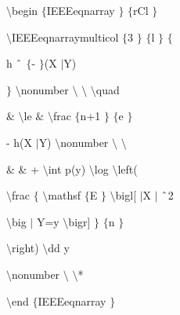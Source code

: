 \vspace{12pt}
\vspace{12pt}
\noindent 
 $  \setminus  $begin $  \{  $IEEEeqnarray $  \}  $ $  \{  $rCl $  \}  $ \par
\vspace{12pt}
\noindent 
 $  \setminus  $IEEEeqnarraymulticol $  \{  $3 $  \}  $ $  \{  $l $  \}  $ $  \{  $ \par
\vspace{12pt}
\noindent 
h $  \string^  $ $  \{  $- $  \}  $(X $  \vert  $Y) \par
\vspace{12pt}
\noindent 
 $  \}  $ $  \setminus  $nonumber $  \setminus  $ $  \setminus  $ $  \setminus  $quad \par
\vspace{12pt}
\noindent 
 $  \&  $  $  \setminus  $le  $  \&  $  $  \setminus  $frac $  \{  $n+1 $  \}  $ $  \{  $e $  \}  $ \par
\vspace{12pt}
\noindent 
- h(X $  \vert  $Y)  $  \setminus  $nonumber $  \setminus  $ $  \setminus  $ \par
\vspace{12pt}
\noindent 
 $  \&  $ $  \&  $ +  $  \setminus  $int p(y)  $  \setminus  $log  $  \setminus  $left( \par
\vspace{12pt}
\noindent 
 $  \setminus  $frac $  \{  $ $  \setminus  $mathsf $  \{  $E $  \}  $ $  \setminus  $bigl[ $  \vert  $X $  \vert  $ $  \string^  $2 \par
\vspace{12pt}
\noindent 
 $  \setminus  $big $  \vert  $ Y=y $  \setminus  $bigr] $  \}  $ $  \{  $n $  \}  $ \par
\vspace{12pt}
\noindent 
 $  \setminus  $right)  $  \setminus  $dd y \par
\vspace{12pt}
\noindent 
 $  \setminus  $nonumber $  \setminus  $ $  \setminus  $* \par
\vspace{12pt}
\noindent 
 $  \setminus  $end $  \{  $IEEEeqnarray $  \}  $ \par
\vspace{12pt}

